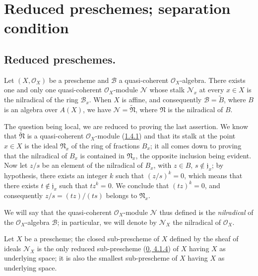\section{Reduced preschemes; separation condition}
\label{section:I.5}

\subsection{Reduced preschemes.}
\label{subsection:I.5.1}

\begin{proposition}[5.1.1]
\label{I.5.1.1}
Let $(X,\mathscr{O}_X)$ be a prescheme and $\mathscr{B}$ a quasi-coherent
$\mathscr{O}_X$-algebra. There exists one and only one quasi-coherent
$\mathscr{O}_X$-module $\mathscr{N}$ whose stalk
$\mathscr{N}_x$ at every $x\in X$ is the nilradical of the ring
$\mathscr{B}_x$. When $X$ is affine, and consequently
$\mathscr{B}=\widetilde{B}$, where $B$ is an algebra over $A(X)$, we have
$\mathscr{N}=\widetilde{\mathfrak{N}}$, where $\mathfrak{N}$ is the nilradical
of $B$.
\end{proposition}

The question being local, we are reduced to proving the last assertion. We
know that $\widetilde{\mathfrak{N}}$ is a quasi-coherent $\mathscr{O}_X$-module
(\hyperref[I.1.4.1]{1.4.1}) and that its stalk at the point
$x\in X$ is the ideal $\mathfrak{N}_x$ of the ring of fractions $B_x$; it all
comes down to proving that the nilradical of $B_x$ is contained in
$\mathfrak{N}_x$, the opposite inclusion being evident. Now let $z/s$ be an
element of the nilradical of $B_x$, with $z\in B$, $s\notin\mathfrak{j}_x$; by
hypothesis, there exists an integer $k$ such that $(z/s)^k=0$, which means
that there exists $t\notin\mathfrak{j}_x$ such that $tz^k=0$. We conclude that
$(tz)^k=0$, and consequently $z/s=(tz)/(ts)$ belongs to $\mathfrak{N}_x$.

We will say that the quasi-coherent $\mathscr{O}_X$-module $\mathscr{N}$ thus
defined is the \emph{nilradical} of the $\mathscr{O}_X$-algebra $\mathscr{B}$;
in particular, we will denote by $\mathscr{N}_X$ the nilradical of
$\mathscr{O}_X$.

\begin{corollary}[5.1.2]
\label{I.5.1.2}
Let $X$ be a prescheme; the closed sub-prescheme of $X$ defined by the sheaf
of ideals $\mathscr{N}_X$ is the only reduced sub-prescheme
(\hyperref[0.4.1.4]{0, 4.1.4}) of $X$ having $X$ as underlying space;
it is also the smallest sub-prescheme of $X$ having $X$ as underlying
space.
\end{corollary}

